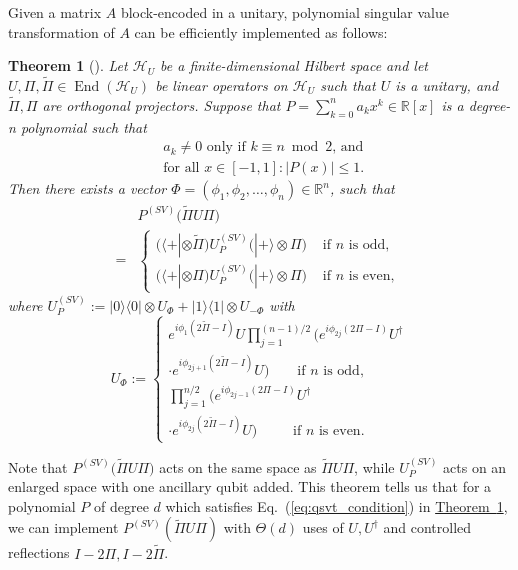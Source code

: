 \documentclass[journal]{IEEEtran}
\newtheorem{theorem}{Theorem}
\newcommand{\eq}[1]{Eq.~(\ref{eq:#1})}
\newcommand{\thm}[1]{\hyperref[thm:#1]{Theorem~\ref*{thm:#1}}}
\newcommand{\xzw}[1]{{\color{blue}{Xinzhao: \textbf{#1}}}}
\begin{document}
Given a matrix $A$ block-encoded in a unitary, polynomial singular value transformation of $A$ can be efficiently implemented as follows:
\begin{theorem}[{\cite[Corollary 18]{gilyen2019singular}}] Let $\mathcal{H}_{U}$ be a finite-dimensional Hilbert space and let $U, \Pi, \widetilde{\Pi} \in \operatorname{End}\left(\mathcal{H}_{U}\right)$ be linear operators on $\mathcal{H}_{U}$ such that $U$ is a unitary, and $\widetilde{\Pi}, \Pi$ are orthogonal projectors. Suppose that $P=\sum_{k=0}^{n} a_{k} x^{k} \in \mathbb{R}[x]$ is a degree-n polynomial such that
  \begin{align}
  \label{eq:qsvt_condition}
    &a_{k} \neq 0 \text{ only if }k \equiv n \bmod 2\text{, and }\nonumber \\&\text{for all }x \in[-1,1]:|P(x)| \leq 1. 
  \end{align}
  Then there exists a vector $\Phi  = (\phi_1, \phi_2, \ldots, \phi_n)  \in \mathbb{R}^{n}$, such that
  \begin{align}
    &P^{(S V)}\big(\widetilde{\Pi} U \Pi\big) \nonumber \\
    = & \begin{cases}
    \big(\langle+| \otimes \widetilde{\Pi}\big) U^{(SV)}_P \big(|+\rangle \otimes \Pi\big) & \text { if } n \text { is odd,} \\
    \big(\langle+| \otimes \Pi\big) U^{(SV)}_P \big(|+\rangle \otimes \Pi\big) & \text { if } n \text { is even, }\end{cases}
  \end{align}
  where $U^{(SV)}_P := |0\rangle\langle 0|\otimes U_{\Phi}+| 1\rangle\langle 1| \otimes U_{-\Phi}$ with
  \begin{equation}
  U_{\Phi}:=\begin{cases}
    e^{i \phi_{1}(2 \widetilde{\Pi}-I)} U \prod_{j=1}^{(n-1) / 2}(e^{i \phi_{2 j}(2 \Pi-I)} U^{\dagger}\\ \cdot e^{i \phi_{2 j+1}(2 \widetilde{\Pi}-I)} U) \qquad \text {if } n \text { is odd,} \\
    \prod_{j=1}^{n / 2}(e^{i \phi_{2 j-1}(2 \Pi-I)} U^{\dagger} \\\cdot e^{i \phi_{2 j}(2 \widetilde{\Pi}-I)} U) \qquad \  \text { if } n \text { is even. }
    \end{cases}
    \end{equation} %
  \label{thm:qsvt}
\end{theorem}
Note that $P^{(S V)}\big(\widetilde{\Pi} U \Pi\big)$ acts on the same space as $\widetilde{\Pi} U \Pi$, while $U_P^{(SV)}$ acts on an enlarged space with one ancillary qubit added. This theorem tells us that for a polynomial $P$ of degree $d$ which satisfies \eq{qsvt_condition} in \thm{qsvt}, we can implement $P^{(SV)}(\widetilde{\Pi}U{\Pi})$ with $\Theta(d)$ uses of $U, U^{\dagger}$ and controlled reflections $I-2\Pi, I-2\widetilde{\Pi}$.
\end{document}
